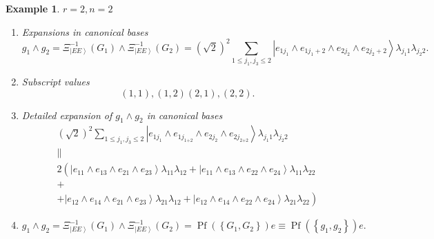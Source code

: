 \documentclass[aps,preprint]{revtex4}%
\newtheorem{example}[theorem]{Example}
\begin{document}
\begin{example}
$r=2,n=2$

\begin{enumerate}
\item Expansions in canonical bases
\[
g_{1}\wedge g_{2}=\Xi_{\left\vert EE\right\rangle }^{-1}\left(  G_{1}\right)
\wedge\Xi_{\left\vert EE\right\rangle }^{-1}\left(  G_{2}\right)  =\left(
\sqrt{2}\right)  ^{2}\sum_{1\leq j_{1},j_{3}\leq2}\left\vert e_{1j_{1}}\wedge
e_{1j_{1}+2}\wedge e_{2j_{2}}\wedge e_{2j_{2}+2}\right\rangle \lambda_{j_{1}%
1}\lambda_{j_{2}2}.
\]


\item Subscript values
\begin{equation}
\left(  1,1\right)  ,\left(  1,2\right)  \left(  2,1\right)  ,\left(
2,2\right)  .
\end{equation}


\item Detailed expansion of $g_{1}\wedge g_{2}$ in canonical bases
\begin{gather}
\left(  \sqrt{2}\right)  ^{2}\sum_{1\leq j_{1},j_{3}\leq2}\left\vert
e_{1j_{1}}\wedge e_{1j_{1\boldsymbol{+}2}}\wedge e_{2j_{2}}\wedge
e_{2j_{2\boldsymbol{+}2}}\right\rangle \lambda_{j_{1}1}\lambda_{j_{2}2}\\
\parallel\\
2\left(  \overset{}{\left\vert e_{11}\wedge e_{13}\wedge e_{21}\wedge
e_{23}\right\rangle \lambda_{11}\lambda_{12}+\left\vert e_{11}\wedge
e_{13}\wedge e_{22}\wedge e_{24}\right\rangle \lambda_{11}\lambda_{22}}\right.
\\
+\\
+\left.  \overset{}{\left\vert e_{12}\wedge e_{14}\wedge e_{21}\wedge
e_{23}\right\rangle \lambda_{21}\lambda_{12}+\left\vert e_{12}\wedge
e_{14}\wedge e_{22}\wedge e_{24}\right\rangle \lambda_{21}\lambda_{22}%
}\right)
\end{gather}


\item
\begin{equation}
g_{1}\wedge g_{2}=\Xi_{\left\vert EE\right\rangle }^{-1}\left(  G_{1}\right)
\wedge\Xi_{\left\vert EE\right\rangle }^{-1}\left(  G_{2}\right)
=\operatorname{Pf}\left(  \left\{  G_{1},G_{2}\right\}  \right)
e\equiv\operatorname{Pf}\left(  \left\{  g_{1},g_{2}\right\}  \right)  e.
\end{equation}



\end{enumerate}
\end{example}
\end{document}
